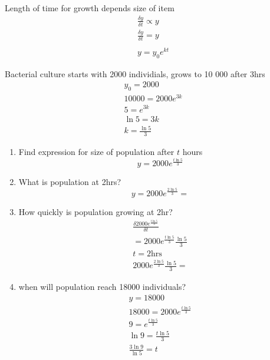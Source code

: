 \documentclass{article}
\begin{document}
	Length of time for growth depends size of item \\
	\begin{gather*}
		\frac{\delta y}{\delta t} \propto y \\
		\frac{\delta y}{\delta t} = y \\
		\\
		y = y_0e^{kt}
	\end{gather*}
	
	Bacterial culture starts with 2000 individials, grows to 10 000 after 3hrs
	\begin{gather*}
		y_0 = 2000 \\
		10000 = 2000e^{3k} \\
		5 = e^{3k} \\ 
		\ln 5 = 3k \\
		k = \frac{\ln 5}{3}
	\end{gather*}	
	\begin{enumerate} 
		\item Find expression for size of population after $ t $ hours
			$$ y = 2000e^{\frac{t \ln 5}{3}} $$
		\item What is population at 2hrs?
			$$ y = 2000e^{\frac{2 \ln 5}{3}} = $$
		\item How quickly is population growing at 2hr?
			\begin{gather}
				\frac{\delta 2000e^{\frac{t \ln 5}{3}}}{\delta t} \\
				= 2000e^{\frac{t \ln 5}{3}}\frac{\ln 5}{3} \\
				t = 2 \text{hrs}\\
				2000e^{\frac{2 \ln 5}{3}}\frac{\ln 5}{3} =  
			\end{gather}
		\item when will population reach 18000 individuals?
			\begin{gather}
				y = 18000 \\
				18000 = 2000e^{\frac{t \ln 5}{3}} \\
				9 = e^{\frac{t \ln 5}{3}} \\
				\ln 9 = \frac{t \ln 5}{3} \\
				\frac{3 \ln 9}{\ln 5} = t
			\end{gather}
	\end{enumerate}
\end{document}

